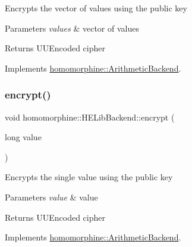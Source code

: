 Encrypts the vector of values using the public key


\begin{DoxyParams}{Parameters}
{\em values} & vector of values \\
\hline
\end{DoxyParams}
\begin{DoxyReturn}{Returns}
U\+U\+Encoded cipher 
\end{DoxyReturn}


Implements \mbox{\hyperlink{classhomomorphine_1_1_arithmetic_backend_a684c16673191eb5f7c6400f3d34cbcc1}{homomorphine\+::\+Arithmetic\+Backend}}.

\mbox{\label{classhomomorphine_1_1_h_e_lib_backend_a0fc8b8ad698a9816dde898087b6b5c57}} 
\subsubsection{\texorpdfstring{encrypt()}{encrypt()}\hspace{0.1cm}{\footnotesize\ttfamily [2/2]}}
{\footnotesize\ttfamily void homomorphine\+::\+H\+E\+Lib\+Backend\+::encrypt (\begin{DoxyParamCaption}\item[{long}]{value }\end{DoxyParamCaption})\hspace{0.3cm}{\ttfamily [virtual]}}

Encrypts the single value using the public key


\begin{DoxyParams}{Parameters}
{\em value} & value \\
\hline
\end{DoxyParams}
\begin{DoxyReturn}{Returns}
U\+U\+Encoded cipher 
\end{DoxyReturn}


Implements \mbox{\hyperlink{classhomomorphine_1_1_arithmetic_backend_abdf6100f3d87580c942526027823fdb1}{homomorphine\+::\+Arithmetic\+Backend}}.

\mbox{\label{classhomomorphine_1_1_h_e_lib_backend_a2c6ed82eeb597b99ae6cdb2734412a0f}} 
